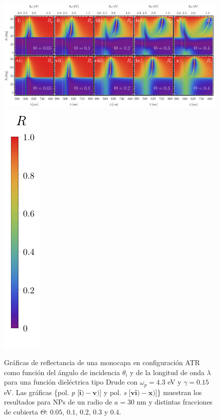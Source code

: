 \documentclass[letterpaper,11pt] {article}
\begin{document}
	\begin{figure}[t!]\centering
\includegraphics[width = .9\linewidth, trim={00 00 00 00}, clip	]{1-Wp4ThetaVar/0-2D_Grid}%
\includegraphics[scale=.85, trim={00 -5 00 00}, clip]{0-RBar_v}
	\caption{Gráficas de reflectancia de una monocapa en configuración ATR como función del ángulo de incidencia $\theta_i$ y de la longitud de onda $\lambda$ para una función dieléctrica tipo Drude con $\omega_p=4. 3$ eV  y  $\gamma=0. 15$ eV.  Las gráficas \{pol.  \emph{p} [$\mathbf{i)-v)}$] y pol.  \emph{s} [$\mathbf{vi)-x)}$]\} muestran los resultados para NPs de un radio de $a=30$ nm y distintas fracciones de cubierta $\Theta$: $0. 05$, $0. 1$, $0. 2$, $0. 3$ y $0. 4$. }	\label{fig:R-ATR4}	
	\end{figure}	
	
\end{document}
